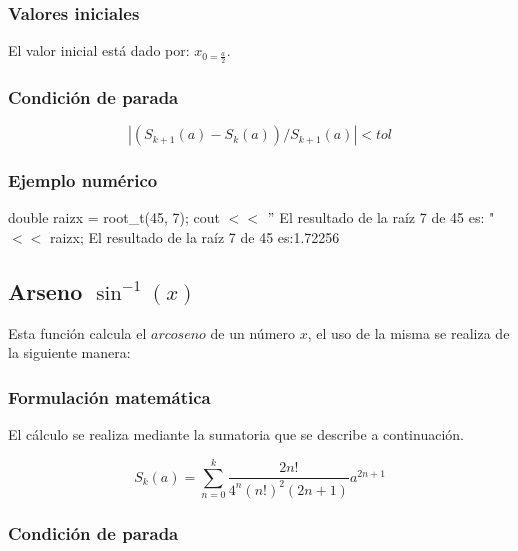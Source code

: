 \documentclass[10pt,a4paper]{article}
\begin{document}
	\subsubsection{Valores iniciales}
	El valor inicial está dado por: $x_{0 = \frac{a}{2}}$.
	\subsubsection{Condición de parada}
	\begin{equation}\label{key22}
		\left\lvert (S_{k+1}(a) - S_{k}(a)) / S_{k+1}(a) \right\lvert < tol
	\end{equation}
	\subsubsection{Ejemplo numérico}
	
	double raizx = root{\_}t(45, 7); \newline
	cout $<<$ $"$ El resultado de la raíz 7 de 45 es: " $<<$ raizx; \newline
	El resultado de la raíz 7 de 45 es:1.72256\newline
	
	\subsection{Arseno $\sin^{-1}(x)$}
	
	Esta función calcula el $arcoseno$ de un número $x$, el uso de la misma se realiza de la siguiente manera:
	
	\begin{center}
	\end{center}
	
	\subsubsection{Formulación matemática}
	
	El cálculo se realiza mediante la sumatoria que se describe a continuación.
	
	\begin{equation}\label{key22}
		S_{k}(a) = \sum_{n=0}^{k}\frac{2n!}{4^{n}(n!)^{2}(2n + 1)}a^{2n+1}
	\end{equation}
	
	\subsubsection{Condición de parada}
	
\end{document}
